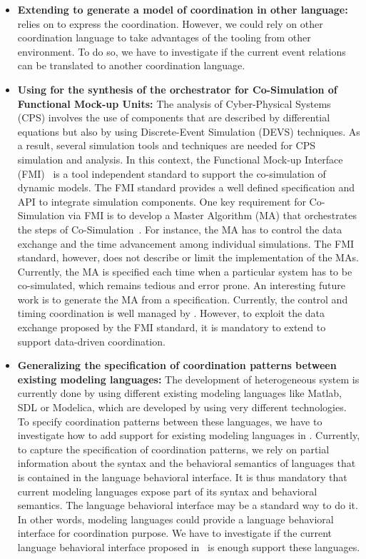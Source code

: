 \begin{itemize}
	\item \textbf{Extending \bcool to generate a model of coordination in other language:} \bcool relies on \ccsl to express the coordination. However, we could rely on other coordination language to take advantages of the tooling from other environment. To do so, we have to investigate if the current event relations can be translated to another coordination language.
	
	\item \textbf{Using \bcool for the synthesis of the orchestrator for Co-Simulation of Functional Mock-up Units:} The analysis of Cyber-Physical Systems (CPS) involves the use of components that are described by differential equations but also by using Discrete-Event Simulation (DEVS) techniques. As a result, several simulation tools and techniques are needed for CPS simulation and analysis. In this context, the Functional Mock-up Interface (FMI)~\cite{fmibib2} is a tool independent standard to support the co-simulation of dynamic models. The FMI standard provides a well defined specification and API to integrate simulation components. One key requirement for Co-Simulation via FMI is to develop a Master Algorithm (MA) that orchestrates the steps of Co-Simulation~\cite{fmibib}. For instance, the MA has to control the data exchange and the time advancement among individual simulations. The FMI standard, however, does not describe or limit the implementation of the MAs. Currently, the MA is specified each time when a particular system has to be co-simulated, which remains tedious and error prone. An interesting future work is to generate the MA from a \bcool specification. Currently, the control and timing coordination is well managed by \bcool. However, to exploit the data exchange proposed by the FMI standard, it is mandatory to extend \bcool to support data-driven coordination. 
	
	\item \textbf{Generalizing the specification of coordination patterns between existing modeling languages:} The development of heterogeneous system is currently done by using different existing modeling languages like Matlab, SDL or Modelica, which are developed by using very different technologies. To specify coordination patterns between these languages, we have to investigate how to add support for existing modeling languages in \bcool. Currently, to capture the specification of coordination patterns, we rely on partial information about the syntax and the behavioral semantics of languages that is contained in the language behavioral interface. It is thus mandatory that current modeling languages expose part of its syntax and behavioral semantics. The language behavioral interface may be a standard way to do it. In other words, modeling languages could provide a language behavioral interface for coordination purpose. We have to investigate if the current language behavioral interface proposed in~\cite{sle13-combemale} is enough support these languages.    
				

\end{itemize}
